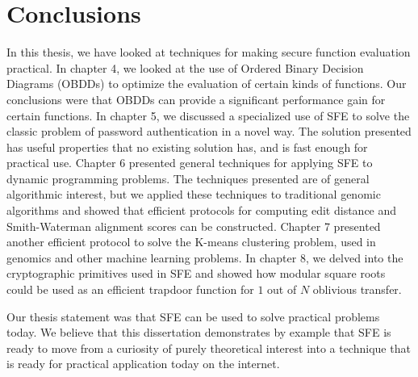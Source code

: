\chapter{Conclusions}
In this thesis, we have looked at techniques for making secure function
evaluation practical. In chapter 4, we looked at the use of Ordered
Binary Decision Diagrams (OBDDs) to optimize the evaluation of certain
kinds of functions. Our conclusions were that OBDDs can provide a
significant performance gain for certain functions. In chapter 5,
we discussed a specialized use of SFE to solve the classic problem
of password authentication in a novel way. The solution presented
has useful properties that no existing solution has, and is fast enough
for practical use. Chapter 6 presented general techniques for applying
SFE to dynamic programming problems. The techniques presented are
of general algorithmic interest, but we applied these techniques to
traditional genomic algorithms and showed that efficient protocols
for computing edit distance and Smith-Waterman alignment scores can
be constructed. Chapter 7 presented another efficient protocol to
solve the K-means clustering problem, used in genomics and other machine
learning problems. In chapter 8, we delved into the cryptographic
primitives used in SFE and showed how modular square roots could be
used as an efficient trapdoor function for $1$ out of $N$ oblivious
transfer.

Our thesis statement was that SFE can be used to solve practical problems
today. We believe that this dissertation demonstrates by example that
SFE is ready to move from a curiosity of purely theoretical interest
into a technique that is ready for practical application today on
the internet.
